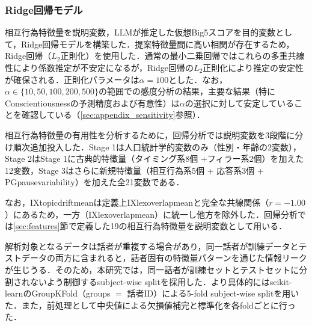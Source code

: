 \documentclass[dvipdfmx,11pt,a4paper]{bxjsarticle}
\renewcommand{\_}{\paperorigunderscore\allowbreak}%
\begin{document}
\subsubsection{Ridge回帰モデル}

相互行為特徴量を説明変数，LLMが推定した仮想Big5スコアを目的変数として，Ridge回帰モデルを構築した．提案特徴量間に高い相関が存在するため，Ridge回帰（$L_2$正則化）を使用した．通常の最小二乗回帰ではこれらの多重共線性により係数推定が不安定になるが，Ridge回帰の$L_2$正則化により推定の安定性が確保される．正則化パラメータは$\alpha = 100$とした．なお，$\alpha \in \{10, 50, 100, 200, 500\}$の範囲での感度分析の結果，主要な結果（特にConscientiousnessの予測精度および有意性）は$\alpha$の選択に対して安定していることを確認している（\ref{sec:appendix_sensitivity}参照）．

相互行為特徴量の有用性を分析するために，回帰分析では説明変数を3段階に分け順次追加投入した．Stage 1は人口統計学的変数のみ（性別・年齢の2変数），Stage 2はStage 1に古典的特徴量（タイミング系8個 +フィラー系2個）を加えた12変数，Stage 3はさらに新規特徴量（相互行為系5個 + 応答系3個 + PG\_pause\_variability）を加えた全21変数である．

なお，IX\_topic\_drift\_meanは定義上IX\_lex\_overlap\_meanと完全な共線関係（$r = -1.00$）にあるため，一方（IX\_lex\_overlap\_mean）に統一し他方を除外した．回帰分析では\ref{sec:features}節で定義した19の相互行為特徴量を説明変数として用いる．

解析対象となるデータは話者が重複する場合があり，同一話者が訓練データとテストデータの両方に含まれると，話者固有の特徴量パターンを通じた情報リークが生じうる．そのため，本研究では，同一話者が訓練セットとテストセットに分割されないよう制御するsubject-wise splitを採用した．より具体的にはscikit-learnのGroupKFold（groups $=$ 話者ID）による5-fold subject-wise splitを用いた．また，前処理として中央値による欠損値補完と標準化を各foldごとに行った．


\end{document}
